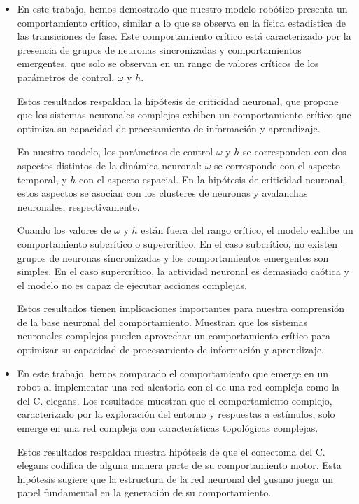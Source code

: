 \begin{itemize}
	
	\item En este trabajo, hemos demostrado que nuestro modelo robótico presenta un
	comportamiento crítico, similar a lo que se observa en la física estadística de
	las transiciones de fase. Este comportamiento crítico está caracterizado por la
	presencia de grupos de neuronas sincronizadas y comportamientos emergentes, que
	solo se observan en un rango de valores críticos de los parámetros de control,
	$\omega$ y $h$.
	
	
	Estos resultados respaldan la hipótesis de criticidad neuronal, que propone que
	los sistemas neuronales complejos exhiben un comportamiento crítico que optimiza
	su capacidad de procesamiento de información y aprendizaje.
	
	En nuestro modelo, los parámetros de control $\omega$ y $h$ se corresponden con
	dos aspectos distintos de la dinámica neuronal: $\omega$ se corresponde con el
	aspecto temporal, y $h$ con el aspecto espacial. En la hipótesis de criticidad
	neuronal, estos aspectos se asocian con los clusteres de neuronas y avalanchas
	neuronales, respectivamente.
	
	Cuando los valores de $\omega$ y $h$ están fuera del rango crítico, el modelo
	exhibe un comportamiento subcrítico o supercrítico. En el caso subcrítico, no
	existen grupos de neuronas sincronizadas y los comportamientos emergentes son
	simples. En el caso supercrítico, la actividad neuronal es demasiado caótica y
	el modelo no es capaz de ejecutar acciones complejas.
	
	Estos resultados tienen implicaciones importantes para nuestra comprensión de la
	base neuronal del comportamiento. Muestran que los sistemas neuronales complejos
	pueden aprovechar un comportamiento crítico para optimizar su capacidad de
	procesamiento de información y aprendizaje.
	
	
	
	
	\item En este trabajo, hemos comparado el comportamiento que emerge en un robot
	al implementar una red aleatoria con el de una red compleja como la del C.
	elegans. Los resultados muestran que el comportamiento complejo, caracterizado
	por la exploración del entorno y respuestas a estímulos, solo emerge en una red
	compleja con características topológicas complejas. 
	
	Estos resultados respaldan nuestra hipótesis de que el conectoma del C. elegans
	codifica de alguna manera parte de su comportamiento motor. Esta hipótesis
	sugiere que la estructura de la red neuronal del gusano juega un papel
	fundamental en la generación de su comportamiento.
	

\end{itemize}
